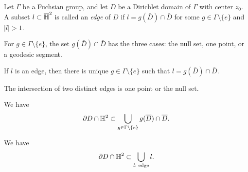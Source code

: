 \documentclass[12pt]{article}
\begin{document}
\begin{prb}
Let $\Gamma$ be a Fuchsian group, and let $D$ be a Dirichlet domain of $\Gamma$ with center $z_0$.
A subset $l\subset\overline{\mathbb{H}}^2$ is called an \emph{edge} of $D$ if $l=g(\bar D)\cap\bar D$ for some $g\in\Gamma\setminus\{e\}$ and $|l|>1$.
\begin{parts}
\item For $g\in\Gamma\setminus\{e\}$, the set $g(\bar D)\cap\bar D$ has the three cases: the null set, one point, or a geodesic segment.
\item If $l$ is an edge, then there is unique $g\in\Gamma\setminus\{e\}$ such that $l=g(\bar D)\cap\bar D$.
\item The intersection of two distinct edges is one point or the null set.
\item We have
\[\partial D\cap\mathbb{H}^2\subset\bigcup_{g\in\Gamma\setminus\{e\}}g(\overline D)\cap\overline D.\]
\item We have
\[\partial D\cap\mathbb{H}^2\subset\bigcup_{l:\text{ edge}}l.\]
\end{parts}
\end{prb}
\end{document}
